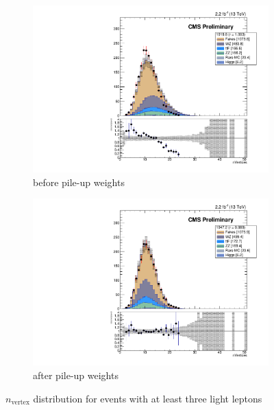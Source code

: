 \begin{figure}[h]
\begin{center}
	\begin{subfigure}[b]{.7\textwidth}
		\includegraphics[width=\textwidth]{Samples/NVERTICES_Tau0-noPileupWeights}
		\caption{before pile-up weights}
	\end{subfigure}
	\begin{subfigure}[b]{.7\textwidth}
		\includegraphics[width=\textwidth]{Samples/NVERTICES_Tau0}
		\caption{after pile-up weights}
	\end{subfigure}
	\caption{$n_\textrm{vertex}$ distribution for events with at least three light leptons
	\label{fig:pileupWeights}}
\end{center}
\end{figure}
